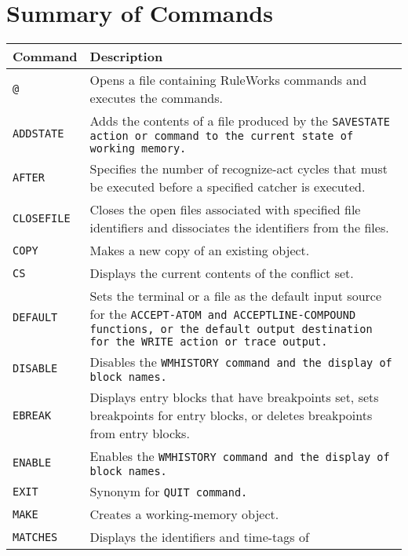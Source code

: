 \section{Summary of Commands}

\begin{longtable}{p{4cm}p{11cm}}
  \toprule
  Command & Description \\
  \midrule
  \verb|@| & Opens a file containing RuleWorks commands and
             executes the commands. \\\addlinespace
  \tt{ADDSTATE} & Adds the contents of a file produced by the
                  \tt{SAVESTATE} action or command to the current
                  state of working memory. \\\addlinespace
  \tt{AFTER} & Specifies the number of recognize-act cycles
               that must be executed before a specified
               catcher is executed. \\\addlinespace
  \tt{CLOSEFILE} & Closes the open files associated with 
                   specified file identifiers and dissociates the 
                   identifiers from the files. \\\addlinespace
  \tt{COPY} & Makes a new copy of an existing object. \\\addlinespace
  \tt{CS} & Displays the current contents of the conflict 
            set. \\\addlinespace
  \tt{DEFAULT} & Sets the terminal or a file as the default 
                 input source for the \tt{ACCEPT-ATOM} and 
                 \tt{ACCEPTLINE-COMPOUND} functions, or the default
                 output destination for the \tt{WRITE} action or 
                 trace output. \\\addlinespace
  \tt{DISABLE} & Disables the \tt{WMHISTORY} command and the display
                 of block names. \\\addlinespace
  \tt{EBREAK} & Displays entry blocks that have breakpoints 
                set, sets breakpoints for entry blocks, or 
                deletes breakpoints from entry blocks. \\\addlinespace
  \tt{ENABLE} & Enables the \tt{WMHISTORY} command and the display  
              of block names. \\\addlinespace
  \tt{EXIT} & Synonym for \tt{QUIT} command. \\\addlinespace
  \tt{MAKE} & Creates a working-memory object. \\\addlinespace
  \tt{MATCHES} & Displays the identifiers and time-tags of 

\end{longtable}
